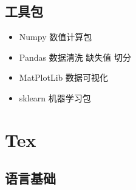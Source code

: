 \documentclass[
]{book}
\providecommand{\tightlist}{%
  \setlength{\itemsep}{0pt}\setlength{\parskip}{0pt}}
\begin{document}
\hypertarget{ux5de5ux5177ux5305}{%
\subsection{工具包}\label{ux5de5ux5177ux5305}}

\begin{itemize}
\tightlist
\item
  Numpy 数值计算包
\item
  Pandas 数据清洗 缺失值 切分
\item
  MatPlotLib 数据可视化
\item
  sklearn 机器学习包
\end{itemize}

\hypertarget{tex}{%
\section{Tex}\label{tex}}

\hypertarget{ux8bedux8a00ux57faux7840}{%
\subsection{语言基础}\label{ux8bedux8a00ux57faux7840}}
\end{document}

